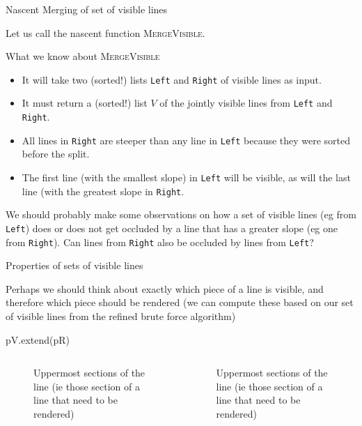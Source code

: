\documentclass{article}
\begin{document}
\begin{frame}{Nascent Merging of set of visible lines}

  Let us call the nascent function \textsc{MergeVisible}.

  \begin{block}{What we know about \textsc{MergeVisible}}
    \begin{itemize}
    \item It will take two (sorted!) lists \texttt{Left} and
      \texttt{Right} of visible lines as input. 
    \item It must return a (sorted!) list $V$ of the jointly visible
      lines from \texttt{Left} and \texttt{Right}.
    \item All lines in \texttt{Right} are steeper than any line in
      \texttt{Left} because they were sorted before the split.
    \item The first line (with the smallest slope) in \texttt{Left} will
      be visible, as will the last line (with the greatest slope in \texttt{Right}.
    \end{itemize}
  \end{block}

  We should probably make some observations on how a set of visible lines
  (eg from \texttt{Left}) does or does not get occluded by a line that
  has a greater slope (eg one from \texttt{Right}). Can lines from
  \texttt{Right} also be occluded by lines from \texttt{Left}?
\end{frame}


\begin{frame}[fragile]{Properties of sets of visible lines}

  Perhaps we should think about exactly which piece of a line is
  visible, and therefore which piece should be rendered (we can compute these based on our set of visible lines from the refined brute force algorithm)

  \begin{sympysilent}
    pV.extend(pR)
  \end{sympysilent}

  \begin{columns}
    \begin{column}{0.5\textwidth}
      \begin{figure}[H]
        \centering
        \caption{Uppermost sections of the line (ie those section of a line that need to be rendered)}
      \end{figure}
    \end{column}
    \begin{column}{0.5\textwidth}
      \begin{figure}[H]
        \centering

      \caption{Uppermost sections of the line (ie those section of a line that need to be rendered)}
    \end{figure}
  \end{column}
  \end{columns}

\end{frame}
\end{document}
